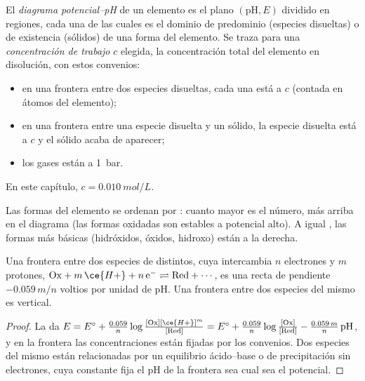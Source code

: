 \begin{definition}\label{def:b1:e-ph-diagrams:e-ph-diagram}
El \emph{diagrama potencial--pH} de un
elemento es el plano $(\mathrm{pH}, E)$ dividido en regiones, cada una de
las cuales es el dominio de predominio (especies disueltas) o de
existencia (sólidos) de una forma del elemento. Se traza para una
\emph{concentración de trabajo} $c$ elegida, la
concentración total del elemento en disolución, con estos convenios:
\begin{itemize}
  \item en una frontera entre dos especies disueltas, cada una está a $c$
        (contada en átomos del elemento);
  \item en una frontera entre una especie disuelta y un sólido, la
        especie disuelta está a $c$ y el sólido acaba de aparecer;
  \item los gases están a \qty{1}{bar}.
\end{itemize}
En este capítulo, $c = \qty{0.010}{mol/L}$.
\end{definition}

Las formas del elemento se ordenan por : cuanto mayor
es el número, más arriba en el diagrama (las formas oxidadas son estables
a potencial alto). A igual , las formas más básicas
(hidróxidos, óxidos,  hidroxo) están a la derecha.

\begin{proposition}\label{prop:b1:e-ph-diagrams:boundary-slope}
Una frontera entre dos especies de  distintos, cuya
 intercambia $n$ electrones y $m$ protones,
$\mathrm{Ox} + m\,\ce{H+} + n\,\mathrm{e^-} \rightleftharpoons \mathrm{Red} +
\cdots$, es una recta de pendiente $-0.059\,m/n$ voltios por unidad de
pH. Una frontera entre dos especies del mismo  es
vertical.
\end{proposition}

\begin{proof}
La  da $E = E^\circ + \frac{0.059}{n}\log\frac{[\mathrm{Ox}]
[\ce{H+}]^m}{[\mathrm{Red}]} = E^\circ + \frac{0.059}{n}\log\frac{[\mathrm{Ox}]}
{[\mathrm{Red}]} - \frac{0.059\,m}{n}\,\mathrm{pH}$, y en la frontera las
concentraciones están fijadas por los convenios. Dos especies del mismo
 están relacionadas por un equilibrio ácido--base o de
precipitación sin electrones, cuya constante fija el pH de la frontera
sea cual sea el potencial.
\end{proof}


